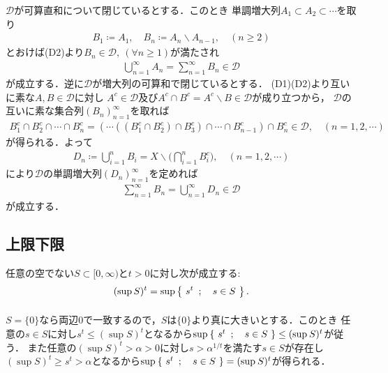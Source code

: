 	\begin{prf}
		$\mathscr{D}$が可算直和について閉じているとする．このとき
		単調増大列$A_1 \subset A_2 \subset \cdots$を取り
		\begin{align}
			B_1 \coloneqq A_1,
			\quad B_n \coloneqq A_n \backslash A_{n-1},
			\quad (n \geq 2)
		\end{align}
		とおけば(D2)より$B_n \in \mathscr{D},\ (\forall n \geq 1)$が満たされ
		\begin{align}
			\bigcup_{n=1}^{\infty} A_n = \sum_{n=1}^{\infty} B_n \in \mathscr{D} 
		\end{align}
		が成立する．逆に$\mathscr{D}$が増大列の可算和で閉じているとする．
		(D1)(D2)より互いに素な$A,B \in \mathscr{D}$に対し
		$A^c \in \mathscr{D}$及び$A^c \cap B^c = A^c \backslash B\in \mathscr{D}$が成り立つから，
		$\mathscr{D}$の互いに素な集合列$(B_n)_{n=1}^{\infty}$を取れば
		\begin{align}
			B_1^c \cap B_2^c \cap \cdots \cap B_n^c
			= \left( \cdots \left( \left( B_1^c \cap B_2^c \right) \cap B_3^c \right) \cap \cdots \cap B_{n-1}^c \right) \cap B_n^c
			\in \mathscr{D},
			\quad (n=1,2,\cdots)
		\end{align}
		が得られる．よって
		\begin{align}
			D_n \coloneqq \bigcup_{i=1}^n B_i = X \backslash \Biggl( \bigcap_{i=1}^n B_i^c \Biggr),
			\quad (n=1,2,\cdots)
		\end{align}
		により$\mathscr{D}$の単調増大列$(D_n)_{n=1}^{\infty}$を定めれば
		\begin{align}
			\sum_{n=1}^{\infty} B_n = \bigcup_{n=1}^{\infty} D_n \in \mathscr{D}
		\end{align}
		が成立する．
		\QED
	\end{prf}

\subsection{上限下限}
	\begin{screen}
		\begin{thm}[上限の冪と冪の上限]\label{thm:exponentiation_of_supremum_supremum_of_exponentiation}
			任意の空でない$S \subset [0,\infty)$と$t > 0$に対し次が成立する:
			\begin{align}
				(\operatorname*{sup}_{} S)^t = \operatorname*{sup}_{} \left\{\ s^t\ \, ; \quad s \in S\ \right\}.
			\end{align}
		\end{thm}
	\end{screen}
	
	\begin{prf}
		$S=\{0\}$なら両辺0で一致するので，$S$は$\{0\}$より真に大きいとする．このとき
		任意の$s \in S$に対し$s^t \leq (\sup{}{S})^t$となるから$\operatorname*{sup}_{} \left\{\ s^t\ \, ; \quad s \in S\ \right\} \leq (\operatorname*{sup}_{} S)^t$が従う．
		また任意の$(\sup{}{S})^t > \alpha > 0$に対し$s > \alpha^{1/t}$を満たす$s \in S$が存在し
		$(\sup{}{S})^t \geq s^t > \alpha$となるから$\operatorname*{sup}_{} \left\{\ s^t\ \, ; \quad s \in S\ \right\} = (\operatorname*{sup}_{} S)^t$が得られる．
		\QED
	\end{prf}

